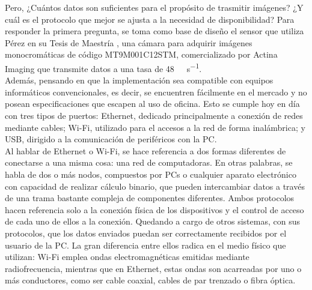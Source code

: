 


Pero, ¿Cuántos datos son suficientes para el propósito de trasmitir imágenes? ¿Y cuál es el protocolo que mejor se ajusta a la necesidad de disponibilidad? Para responder la primera pregunta, se toma como base de diseño el sensor que utiliza Pérez en su Tesis de Maestría \cite{Perez2018}, una cámara para adquirir imágenes monocromáticas de código MT9M001C12STM, comercializado por Actina Imaging \cite{MicronTechnology2004} que transmite datos a una tasa de \SI{48}{\mega\bit\per\second}.\\

Además, pensando en que la implementación sea compatible con equipos informáticos convencionales, es decir, se encuentren fácilmente en el mercado y no posean especificaciones que escapen al uso de oficina. Esto se cumple hoy en día con tres tipos de puertos: Ethernet, dedicado principalmente a conexión de redes mediante cables; Wi-Fi, utilizado para el accesos a la red de forma inalámbrica; y USB, dirigido a la comunicación de periféricos con la PC.\\

Al hablar de Ethernet o Wi-Fi, se hace referencia a dos formas diferentes de conectarse a una misma cosa: una red de computadoras. En otras palabras, se habla de dos o más nodos, compuestos por PCs o cualquier aparato electrónico con capacidad de realizar cálculo binario, que pueden intercambiar datos a través de una trama bastante compleja de componentes diferentes. Ambos protocolos hacen referencia solo a la conexión física de los dispositivos y el control de acceso de cada uno de ellos a la conexión. Quedando a cargo de otros sistemas, con sus protocolos, que los datos enviados puedan ser correctamente recibidos por el usuario de la PC. La gran diferencia entre ellos radica en el medio físico que utilizan: Wi-Fi emplea ondas electromagnéticas emitidas mediante radiofrecuencia, mientras que en Ethernet, estas ondas son acarreadas por uno o más conductores, como ser cable coaxial, cables de par trenzado o fibra óptica.\\

